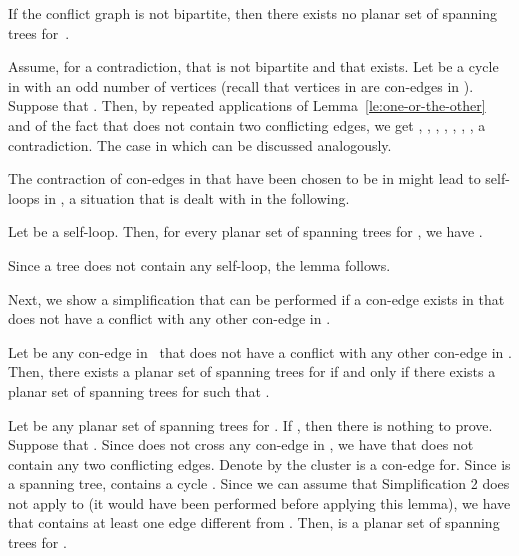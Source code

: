 \documentclass[letter,runningheads]{llncs}
\renewenvironment{proof}
{{\em Proof.\ }}{\hspace*{\fill}\par\vspace{2mm}}
\begin{document}
\begin{lemma}[{\sc Test 2}]\label{le:conflicts-are-bipartite}
If the conflict graph  is not bipartite, then there exists no planar set  of spanning trees for~.
\end{lemma}

\begin{proof}
Assume, for a contradiction, that  is not bipartite and that  exists. Let  be a cycle in  with an odd number of vertices (recall that vertices in  are con-edges in ). Suppose that . Then, by repeated applications of Lemma~\ref{le:one-or-the-other} and of the fact that  does not contain two conflicting edges, we get , , , , , , , a contradiction. The case in which  can be discussed analogously.
\end{proof}



The contraction of con-edges in  that have been chosen to be in  might lead to self-loops in , a situation that is dealt with in the following.
\begin{lemma}[{\sc Simplification 2}]\label{le:self-loop}
Let  be a self-loop. Then, for every planar set  of spanning trees for , we have .
\end{lemma}

\begin{proof}
Since a tree does not contain any self-loop, the lemma follows.
\end{proof}


Next, we show a simplification that can be performed if a con-edge exists in  that does not have a conflict with any other con-edge in .
\begin{lemma}[{\sc Simplification 3}]\label{le:non-conf}
Let  be any con-edge in~ that does not have a conflict with any other con-edge in . Then, there exists a planar set  of spanning trees for  if and only if there exists a planar set  of spanning trees for  such that .
\end{lemma}

\begin{proof}
Let  be any planar set of spanning trees for . If , then there is nothing to prove. Suppose that . Since  does not cross any con-edge in , we have that  does not contain any two conflicting edges. Denote by  the cluster  is a con-edge for. Since  is a spanning tree,  contains a cycle . Since we can assume that {\sc Simplification 2} does not apply to  (it would have been performed before applying this lemma), we have that  contains at least one edge  different from . Then,  is a planar set of spanning trees for . \end{proof}
\end{document}
